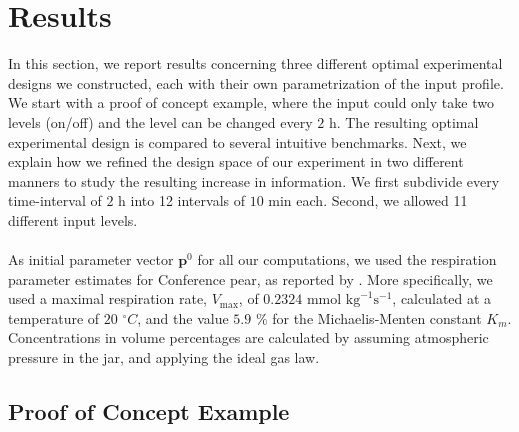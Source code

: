 \section{Results}
\label{Results}
In this section, we report results concerning three different optimal experimental designs we constructed, each with their own parametrization of the input profile. We start with a proof of concept example, where the input could only take two levels (on/off) and the level can be changed every $2 \text{ h}$. The resulting optimal experimental  design is compared to several intuitive benchmarks. Next, we explain how we refined the design space of our experiment in two different manners to study the resulting increase in information. We first subdivide every time-interval of $2 \text{ h}$ into 12 intervals of $10 \text{ min}$ each. Second, we allowed 11 different input levels.
\\
\\
As initial parameter vector $\mathbf{p}^0$ for all our computations, we used the respiration parameter estimates for Conference pear, as reported by \textcite{lammertyn1}. More specifically, we used a maximal respiration rate, $V_{\text{max}}$, of $0.2324 \text{ mmol kg}^{-1}\text{s}^{-1}$, calculated at a temperature of $20$ $^\circ C$, and the value $5.9$ $\%$ for the Michaelis-Menten constant $K_m$. {\color{red}Concentrations in volume percentages are calculated by assuming atmospheric pressure in the jar, and applying the ideal gas law.}
\subsection{Proof of Concept Example}
\label{Experiment1}

